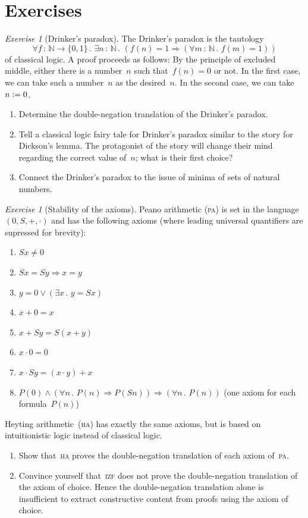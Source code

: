 \documentclass[10pt,reqno,a4paper,openany]{amsbook}
\theoremstyle{definition}
\theoremstyle{plain}
\theoremstyle{remark}
\newcommand{\NN}{\mathbb{N}}
\newcommand{\?}{\,{:}\,}
\renewcommand{\_}{\mathpunct{.}\,}
\newcommand{\defeq}{\vcentcolon=}
\newtheorem{exercise}[defn]{Exercise}
\renewcommand{\theenumi}{\alph{enumi}}
\begin{document}
\section{Exercises}

\begin{exercise}[Drinker's paradox]
The Drinker's paradox is the tautology
\[ \forall f \? \NN \to \{0,1\}\_ \exists n \? \NN\_ (f(n) = 1
\Rightarrow (\forall m \? \NN\_ f(m) = 1)) \]
of classical logic. A proof proceeds as follows: By the principle of
excluded middle, either there is a number~$n$ such that~$f(n) = 0$ or not. In
the first case, we can take such a number~$n$ as the desired~$n$. In the second
case, we can take~$n \defeq 0$.
\begin{enumerate}
\item Determine the double-negation translation of the Drinker's paradox.
\item Tell a classical logic fairy tale for Drinker's paradox similar to the
story for Dickson's lemma. The protagonist of the story will change their mind
regarding the correct value of~$n$; what is their first choice?
\item Connect the Drinker's paradox to the issue of minima of sets of natural
numbers.
\end{enumerate}
\end{exercise}

\begin{exercise}[Stability of the axioms]\label{ex:stability-axioms}
Peano arithmetic (\textsc{pa}) is set in the language~$(0,S,+,\cdot)$ and has
the following axioms (where leading universal quantifiers are supressed for
brevity):
\begin{enumerate}
\renewcommand{\theenumi}{\arabic{enumi}}
\item $Sx \neq 0$
\item $Sx = Sy \Rightarrow x = y$
\item $y = 0 \vee (\exists x\_ y = Sx)$
\item $x + 0 = x$
\item $x + Sy = S(x+y)$
\item $x \cdot 0 = 0$
\item $x \cdot Sy = (x \cdot y) + x$
\item $P(0) \wedge (\forall n\_ P(n) \Rightarrow P(Sn)) \Longrightarrow
(\forall n\_ P(n))$ (one axiom for each formula~$P(n)$)
\end{enumerate}
Heyting arithmetic~(\textsc{ha}) has exactly the same axioms, but is based on intuitionistic
logic instead of classical logic.
\begin{enumerate}
\item Show that~\textsc{ha} proves the double-negation translation of each
axiom of~\textsc{pa}.
\item Convince yourself that~\textsc{izf} does not prove the double-negation
translation of the axiom of choice. Hence the double-negation translation
alone is insufficient to extract constructive content from proofs using the
axiom of choice.
\end{enumerate}
\end{exercise}
\end{document}
